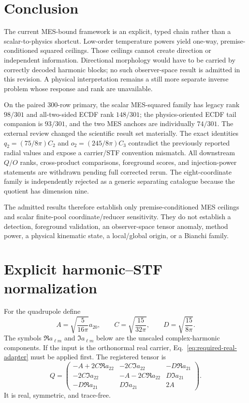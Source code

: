 \documentclass[11pt,a4paper]{article}
\begin{document}
\section{Conclusion}

The current MES-bound framework is an explicit, typed chain rather than a
scalar-to-physics shortcut.  Low-order temperature powers yield one-way,
premise-conditioned squared ceilings.  Those ceilings cannot create direction
or independent information.  Directional morphology would have to be carried
by correctly decoded harmonic blocks; no such observer-space result is
admitted in this revision.  A physical interpretation remains a still more
separate inverse problem whose response and rank are unavailable.

On the paired 300-row primary, the scalar MES-squared family has legacy rank
$98/301$ and all-two-sided ECDF rank $148/301$; the physics-oriented ECDF tail
companion is $93/301$, and the two MES anchors are individually $74/301$.
The external review changed the scientific result set materially.  The exact
identities $q_2=(75/8\pi)C_2$ and $o_2=(245/8\pi)C_3$ contradict the previously
reported radial values and expose a carrier/STF convention mismatch.  All
downstream $Q/O$ ranks, cross-product comparisons, foreground scores, and
injection-power statements are withdrawn pending full corrected rerun.  The
eight-coordinate family is independently rejected as a generic separating
catalogue because the quotient has dimension nine.

The admitted results therefore establish only premise-conditioned MES ceilings
and scalar finite-pool coordinate/reducer sensitivity.  They do not establish
a detection, foreground validation, an observer-space tensor anomaly, method
power, a physical kinematic state, a local/global origin, or a Bianchi family.

\appendix
\section{Explicit harmonic--STF normalization}
\label{app:bridge}

For the quadrupole define
\[
A=\sqrt{\frac{5}{16\pi}}a_{20},\qquad
C=\sqrt{\frac{15}{32\pi}},\qquad
D=\sqrt{\frac{15}{8\pi}}.
\]
The symbols $\Re a_{\ell m}$ and $\Im a_{\ell m}$ below are the unscaled
complex-harmonic components.  If the input is the orthonormal real carrier,
Eq.~\eqref{eq:required-real-adapter} must be applied first.
The registered tensor is
\[
Q=\begin{pmatrix}
-A+2C\Re a_{22} & -2C\Im a_{22} & -D\Re a_{21}\\
-2C\Im a_{22} & -A-2C\Re a_{22} & D\Im a_{21}\\
-D\Re a_{21} & D\Im a_{21} & 2A
\end{pmatrix}.
\]
It is real, symmetric, and trace-free.
\end{document}
